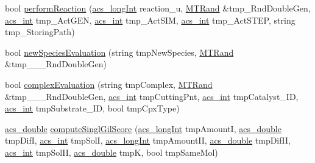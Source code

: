 \begin{DoxyCompactItemize}
bool \hyperlink{classenvironment_a1db4e67ba458a54f4fab3e10a203765c}{perform\-Reaction} (\hyperlink{acs__headers_8h_a19319d75f02db4308bc5c0026d98cd85}{acs\-\_\-long\-Int} reaction\-\_\-u, \hyperlink{class_m_t_rand}{M\-T\-Rand} \&tmp\-\_\-\-Rnd\-Double\-Gen, \hyperlink{acs__headers_8h_a8d277355641a098190360234e2ebde35}{acs\-\_\-int} tmp\-\_\-\-Act\-G\-E\-N, \hyperlink{acs__headers_8h_a8d277355641a098190360234e2ebde35}{acs\-\_\-int} tmp\-\_\-\-Act\-S\-I\-M, \hyperlink{acs__headers_8h_a8d277355641a098190360234e2ebde35}{acs\-\_\-int} tmp\-\_\-\-Act\-S\-T\-E\-P, string tmp\-\_\-\-Storing\-Path)
\item 
bool \hyperlink{classenvironment_aa4b3e51bd7bbb2a287f0963e261cb79b}{new\-Species\-Evaluation} (string tmp\-New\-Species, \hyperlink{class_m_t_rand}{M\-T\-Rand} \&tmp\-\_\-\-\_\-\-\_\-\-Rnd\-Double\-Gen)
\item 
bool \hyperlink{classenvironment_a866ffc56a30e1b2698158a5428a1de0c}{complex\-Evaluation} (string tmp\-Complex, \hyperlink{class_m_t_rand}{M\-T\-Rand} \&tmp\-\_\-\-\_\-\-\_\-\-Rnd\-Double\-Gen, \hyperlink{acs__headers_8h_a8d277355641a098190360234e2ebde35}{acs\-\_\-int} tmp\-Cutting\-Pnt, \hyperlink{acs__headers_8h_a8d277355641a098190360234e2ebde35}{acs\-\_\-int} tmp\-Catalyst\-\_\-\-I\-D, \hyperlink{acs__headers_8h_a8d277355641a098190360234e2ebde35}{acs\-\_\-int} tmp\-Substrate\-\_\-\-I\-D, bool tmp\-Cpx\-Type)
\item 
\hyperlink{acs__headers_8h_ab776853a005fcbf56af0424a2a4dd607}{acs\-\_\-double} \hyperlink{classenvironment_ae1270b9c235dd6b28413075197dba8e0}{compute\-Singl\-Gil\-Score} (\hyperlink{acs__headers_8h_a19319d75f02db4308bc5c0026d98cd85}{acs\-\_\-long\-Int} tmp\-Amount\-I, \hyperlink{acs__headers_8h_ab776853a005fcbf56af0424a2a4dd607}{acs\-\_\-double} tmp\-Dif\-I, \hyperlink{acs__headers_8h_a8d277355641a098190360234e2ebde35}{acs\-\_\-int} tmp\-Sol\-I, \hyperlink{acs__headers_8h_a19319d75f02db4308bc5c0026d98cd85}{acs\-\_\-long\-Int} tmp\-Amount\-I\-I, \hyperlink{acs__headers_8h_ab776853a005fcbf56af0424a2a4dd607}{acs\-\_\-double} tmp\-Dif\-I\-I, \hyperlink{acs__headers_8h_a8d277355641a098190360234e2ebde35}{acs\-\_\-int} tmp\-Sol\-I\-I, \hyperlink{acs__headers_8h_ab776853a005fcbf56af0424a2a4dd607}{acs\-\_\-double} tmp\-K, bool tmp\-Same\-Mol)
\item 

\end{DoxyCompactItemize}
